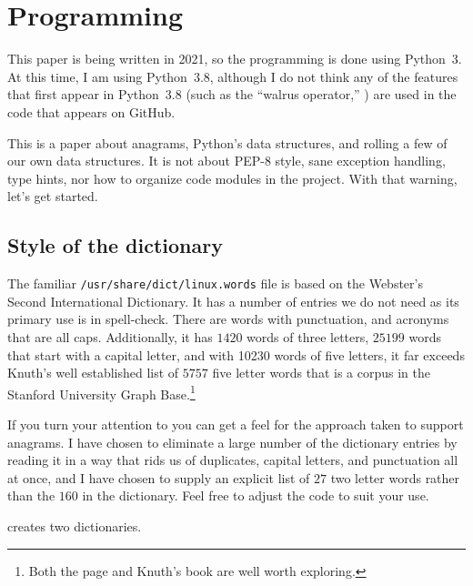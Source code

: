 \documentclass[letterpaper, 11pt]{article}
\begin{document}
\newpage
\section{Programming}

This paper is being written in 2021, so the programming is 
done using Python~3. At this time, I am using Python~3.8, although
I do not think any of the features that first appear in Python~3.8
(such as the ``walrus operator,'' \lit{:=} ) are used in the code
that appears on GitHub.

This is a paper about anagrams, Python's data structures, and rolling
a few of our own data structures. It is not about PEP-8 style, sane
exception handling, type hints, nor how to organize code modules
in the project. With that warning, let's get started.

\subsection{Style of the dictionary}

The familiar \verb|/usr/share/dict/linux.words| file is based on the
Webster's Second International Dictionary. It has a number
of entries we do not need as its primary use is in spell-check. 
There are words with punctuation, and
acronyms that are all caps. Additionally, it has $1420$ words of three
letters, $25199$ words that start with a capital letter, and with 10230
words of five letters, it far exceeds Knuth's well established list
of $5757$ five letter words that is a corpus in the Stanford University
Graph Base.\footnote{
Both the page and Knuth's book are well worth exploring.}

If you turn your attention to  you can get a
feel for the approach taken to support anagrams. I have chosen to
eliminate a large number of the dictionary entries by reading it
in a way that rids us of duplicates, capital letters, and punctuation
all at once, and I have chosen to supply an explicit list of $27$
two letter words rather than the $160$ in the dictionary. Feel
free to adjust the code to suit your use.

 creates two dictionaries.
\end{document}
